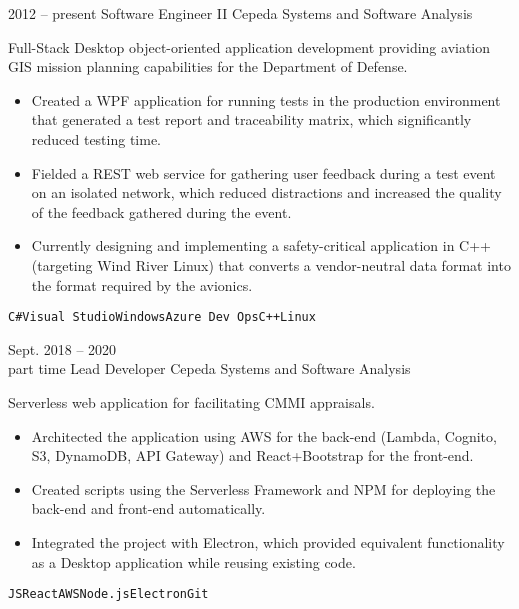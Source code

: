 \documentclass[9pt]{developercv} %
\begin{document}
\begin{entrylist}
	\entry
		{2012 -- present}
		{Software Engineer II}
		{Cepeda Systems and Software Analysis}
		{Full-Stack Desktop object-oriented application development providing aviation GIS mission planning capabilities for the Department of Defense.\\
		\begin{itemize}
			\item Created a WPF application for running tests in the production environment that generated a test report and traceability matrix, which significantly reduced testing time.
			\item Fielded a REST web service for gathering user feedback during a test event on an isolated network, which reduced distractions and increased the quality of the feedback gathered during the event.
			\item Currently designing and implementing a safety-critical application in C++ (targeting Wind River Linux) that converts a vendor-neutral data format into the format required by the avionics. 
		\end{itemize}
		\texttt{C\#}\slashsep\texttt{Visual Studio}\slashsep\texttt{Windows}\slashsep\texttt{Azure Dev Ops}\slashsep\texttt{C++}\slashsep\texttt{Linux}}
	\entry
		{Sept. 2018 -- 2020\\\footnotesize{part time}}
		{Lead Developer}
		{Cepeda Systems and Software Analysis}
		{Serverless web application for facilitating CMMI appraisals.\\
		\begin{itemize}
			\item Architected the application using AWS for the back-end (Lambda, Cognito, S3, DynamoDB, API Gateway) and React+Bootstrap for the front-end.
			\item Created scripts using the Serverless Framework and NPM for deploying the back-end and front-end automatically. 
			\item Integrated the project with Electron, which provided equivalent functionality as a Desktop application while reusing existing code.
		\end{itemize}
		\texttt{JS}\slashsep\texttt{React}\slashsep\texttt{AWS}\slashsep\texttt{Node.js}\slashsep\texttt{Electron}\slashsep\texttt{Git}}
\end{entrylist}

\end{document}
